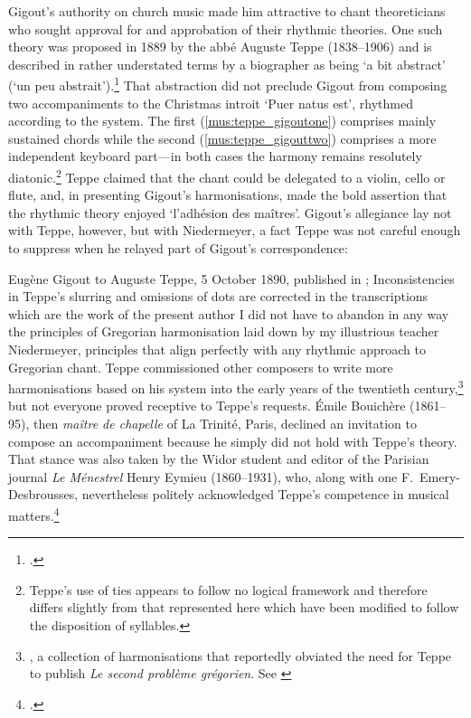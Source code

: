 %
Gigout's authority on church music made him attractive to chant theoreticians who sought approval for and approbation of their rhythmic theories.
One such theory was proposed in 1889 by the abbé Auguste Teppe (1838--1906) and is described in rather understated terms by a biographer as being `a bit abstract' (`un peu abstrait').\footcite[8, 337, 351]{JolyabbeAugusteTeppe1906}
That abstraction did not preclude Gigout from composing two accompaniments to the Christmas introit `Puer natus est', rhythmed according to the system.
The first (\cref{mus:teppe_gigoutone}) comprises mainly sustained chords while the second (\cref{mus:teppe_gigouttwo}) comprises a more independent keyboard part---in both cases the harmony remains resolutely diatonic.\footnote{Teppe's use of ties appears to follow no logical framework and therefore differs slightly from that represented here which have been modified to follow the disposition of syllables.}
Teppe claimed that the chant could be delegated to a violin, cello or flute, and, in presenting Gigout's harmonisations, made the bold assertion that the rhythmic theory enjoyed `l'adhésion des maîtres'.
\label{int:gigout_teppe}%
Gigout's allegiance lay not with Teppe, however, but with Niedermeyer, a fact Teppe was not careful enough to suppress when he relayed part of Gigout's correspondence:
\noclub[2]

  {Eugène Gigout to Auguste Teppe, 5 October 1890, published in \cite[5, 255--31]{TeppePremierproblemegregorien1889}; Inconsistencies in Teppe's slurring and omissions of dots are corrected in the transcriptions which are the work of the present author}
{I did not have to abandon in any way the principles of Gregorian harmonisation laid down by my illustrious teacher Niedermeyer, principles that align perfectly with any rhythmic approach to Gregorian chant.}
\noindent
Teppe commissioned other composers to write more harmonisations based on his system into the early years of the twentieth century,\footnote{\covid{}\cite{TeppeLivreorgue}, a collection of harmonisations that reportedly obviated the need for Teppe to publish \emph{Le second problème grégorien}. See \cite[19]{TeppeParallelismeversstrophes1900}\label{hl:teppe_second}} but not everyone proved receptive to Teppe's requests.
Émile Bouichère (1861--95), then \emph{maître de chapelle} of La Trinité, Paris, declined an invitation to compose an accompaniment because he simply did not hold with Teppe's theory.
That stance was also taken by the Widor student and editor of the Parisian journal \emph{Le Ménestrel} Henry Eymieu (1860--1931), who, along with one F.~Emery-Desbrousses, nevertheless politely acknowledged Teppe's competence in musical matters.\footcites[167]{EymieuEtudesbiographiesmusicales1892}
\nowidow[2]

